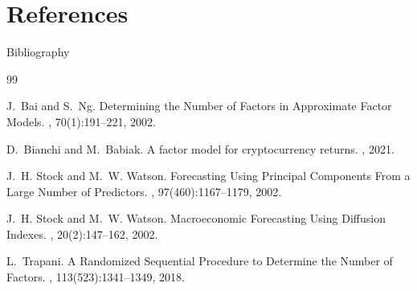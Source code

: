 \documentclass{beamer}
\begin{document}
\section*{References}

\begin{frame}[allowframebreaks]{Bibliography}
    \beamertemplatearticlebibitems
    
    \begin{thebibliography}{99}
        
        J.~Bai and S.~Ng.
        \newblock Determining the Number of Factors in Approximate Factor Models.
        , 70(1):191--221, 2002.
        
        D.~Bianchi and M.~Babiak.
        \newblock A factor model for cryptocurrency returns.
        , 2021.
        
        J.~H. Stock and M.~W. Watson.
        \newblock Forecasting Using Principal Components From a Large Number of Predictors.
        , 97(460):1167--1179, 2002.
        
        J.~H. Stock and M.~W. Watson.
        \newblock Macroeconomic Forecasting Using Diffusion Indexes.
        , 20(2):147--162, 2002.
        
        L.~Trapani.
        \newblock A Randomized Sequential Procedure to Determine the Number of Factors.
        , 113(523):1341--1349, 2018.

    \end{thebibliography}
\end{frame}
\end{document}
